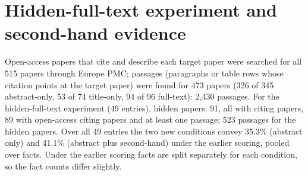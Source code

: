 \documentclass{article} %
\begin{document}
\FloatBarrier
\section{Hidden-full-text experiment and second-hand evidence}
\label{app:hidden}
Open-access papers that cite and describe each target paper were searched for all 515 papers through Europe PMC; passages (paragraphs or table rows whose citation points at the target paper) were found for 473 papers (326 of 345 abstract-only, 53 of 74 title-only, 94 of 96 full-text): 2,430 passages. For the hidden-full-text experiment (49 entries), hidden papers: 91, all with citing papers, 89 with open-access citing papers and at least one passage; 523 passages for the hidden papers. Over all 49 entries the two new conditions convey 35.3\% (abstract only) and 41.1\% (abstract plus second-hand) under the earlier scoring, pooled over facts. Under the earlier scoring facts are split separately for each condition, so the fact counts differ slightly.
\end{document}

